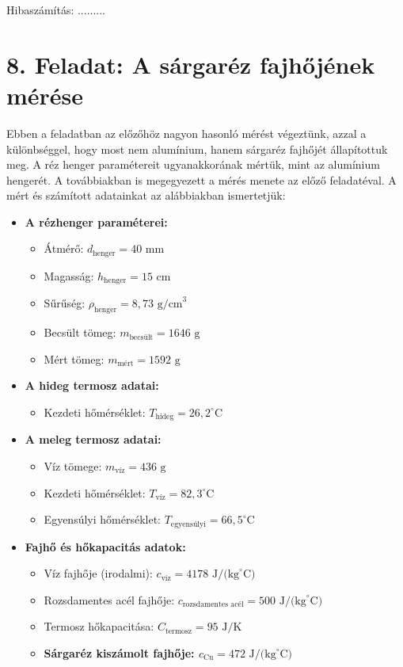 \documentclass{article}
\begin{document}
Hibaszámítás: .........

\section*{8. Feladat: A sárgaréz fajhőjének mérése}

Ebben a feladatban az előzőhöz nagyon hasonló mérést végeztünk, azzal a különbséggel, hogy most nem alumínium, hanem sárgaréz fajhőjét állapítottuk meg. A réz henger paramétereit ugyanakkorának mértük, mint az alumínium hengerét. A továbbiakban is megegyezett a mérés menete az előző feladatéval. A mért és számított adatainkat az alábbiakban ismertetjük:

\begin{itemize}
    \item \textbf{A rézhenger paraméterei:}
    \begin{itemize}
        \item Átmérő: $d_{\text{henger}} = 40 \text{ mm}$
        \item Magasság: $h_{\text{henger}} = 15 \text{ cm}$
        \item Sűrűség: $\rho_{\text{henger}} = 8,73 \text{ g/cm}^3$
        \item Becsült tömeg: $m_{\text{becsült}} = 1646 \text{ g}$
        \item Mért tömeg: $m_{\text{mért}} = 1592 \text{ g}$
    \end{itemize}
    \item \textbf{A hideg termosz adatai:}
    \begin{itemize}
        \item Kezdeti hőmérséklet: $T_{\text{hideg}} = 26,2^{\circ}\text{C}$
    \end{itemize}
    \item \textbf{A meleg termosz adatai:}
    \begin{itemize}
        \item Víz tömege: $m_{\text{víz}} = 436 \text{ g}$
        \item Kezdeti hőmérséklet: $T_{\text{víz}} = 82,3^{\circ}\text{C}$
        \item Egyensúlyi hőmérséklet: $T_{\text{egyensúlyi}} = 66,5^{\circ}\text{C}$
    \end{itemize}
    \item \textbf{Fajhő és hőkapacitás adatok:}
    \begin{itemize}
        \item Víz fajhője (irodalmi): $c_{\text{víz}} = 4178 \text{ J/(kg}^{\circ}\text{C)}$
        \item Rozsdamentes acél fajhője: $c_{\text{rozsdamentes acél}} = 500 \text{ J/(kg}^{\circ}\text{C)}$
        \item Termosz hőkapacitása: $C_{\text{termosz}} = 95 \text{ J/K}$
        \item \textbf{Sárgaréz kiszámolt fajhője: $c_{\text{Cu}} = 472 \text{ J/(kg}^{\circ}\text{C)}$}
    \end{itemize}
\end{itemize}
\end{document}
